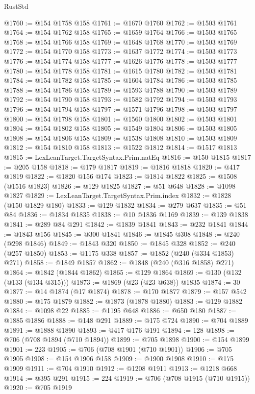 \begin{lexlean}{RustStd}
\begin{coremodule}
@1760 := @154 @1758 @158
@1761 := @1670 @1760
@1762 := @1503 @1761
@1764 := @154 @1762 @158
@1765 := @1659 @1764
@1766 := @1503 @1765
@1768 := @154 @1766 @158
@1769 := @1648 @1768
@1770 := @1503 @1769
@1772 := @154 @1770 @158
@1773 := @1637 @1772
@1774 := @1503 @1773
@1776 := @154 @1774 @158
@1777 := @1626 @1776
@1778 := @1503 @1777
@1780 := @154 @1778 @158
@1781 := @1615 @1780
@1782 := @1503 @1781
@1784 := @154 @1782 @158
@1785 := @1604 @1784
@1786 := @1503 @1785
@1788 := @154 @1786 @158
@1789 := @1593 @1788
@1790 := @1503 @1789
@1792 := @154 @1790 @158
@1793 := @1582 @1792
@1794 := @1503 @1793
@1796 := @154 @1794 @158
@1797 := @1571 @1796
@1798 := @1503 @1797
@1800 := @154 @1798 @158
@1801 := @1560 @1800
@1802 := @1503 @1801
@1804 := @154 @1802 @158
@1805 := @1549 @1804
@1806 := @1503 @1805
@1808 := @154 @1806 @158
@1809 := @1538 @1808
@1810 := @1503 @1809
@1812 := @154 @1810 @158
@1813 := @1522 @1812
@1814 := @1517 @1813
@1815 := LexLeanTarget.TargetSyntax.Prim.natEq
@1816 := @150 @1815
@1817 := @205 @158
@1818 := @179 @1817
@1819 := @1816 @1818
@1820 := @417 @1819
@1822 := @1820 @156 @174
@1823 := @1814 @1822
@1825 := @1508 (@1516 @1823)
@1826 := @129 @1825
@1827 := @51 @648
@1828 := @1098 @1827
@1829 := LexLeanTarget.TargetSyntax.Prim.index
@1832 := @1828 (@150 @1829 @180)
@1833 := @129 @1832
@1834 := @279 @637
@1835 := @51 @84
@1836 := @1834 @1835
@1838 := @10 @1836 @1169
@1839 := @139 @1838
@1841 := @289 @84 @291
@1842 := @1839 @1841
@1843 := @232 @1841
@1844 := @1843 @156
@1845 := @300 @1841
@1846 := @1845 @308
@1848 := @240 (@298 @1846)
@1849 := @1843 @320
@1850 := @1845 @328
@1852 := @240 (@257 @1850)
@1853 := @1175 @338
@1857 := @1852 (@240 (@334 @1853) @271)
@1858 := @1849 @1857
@1862 := @1848 (@240 (@316 @1858) @271)
@1864 := @1842 (@1844 @1862)
@1865 := @129 @1864
@1869 := @130 (@132 (@133 (@134 @315)))
@1873 := @1869 (@23 (@23 @638)) @1835
@1874 := 30
@1877 := @14 @1874 (@17 @1874)
@1878 := @170 @1877
@1879 := @157 @542
@1880 := @175 @1879
@1882 := @1873 (@1878 @1880)
@1883 := @129 @1882
@1884 := @1098 @22
@1885 := @1195 @648
@1886 := @650 @180
@1887 := @1885 @1886
@1888 := @148 @291
@1889 := @175 @724
@1890 := @704 @1889
@1891 := @1888 @1890
@1893 := @417 @176 @191
@1894 := 128
@1898 := @706 (@708 @1894 (@710 @1894))
@1899 := @705 @1898
@1900 := @154 @1899
@1901 := 223
@1905 := @706 (@708 @1901 (@710 @1901))
@1906 := @705 @1905
@1908 := @154 @1906 @158
@1909 := @1900 @1908
@1910 := @175 @1909
@1911 := @704 @1910
@1912 := @1208 @1911
@1913 := @1218 @668
@1914 := @395 @291
@1915 := 224
@1919 := @706 (@708 @1915 (@710 @1915))
@1920 := @705 @1919

\end{coremodule}
\end{lexlean}
